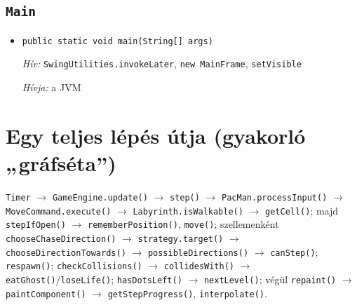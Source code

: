 \documentclass[10pt, a4paper]{article}
\newcommand{\fn}[3]{%
  \item \texttt{#1}\par
  {\small\textit{Hív:} #2\par\textit{Hívja:} #3}\vspace{3pt}}
\begin{document}
\subsection*{\texttt{Main}}
\begin{itemize}
\fn{public static void main(String[] args)}{\texttt{SwingUtilities.invokeLater}, \texttt{new MainFrame}, \texttt{setVisible}}{a JVM}
\end{itemize}

\section*{Egy teljes lépés útja (gyakorló „gráfséta”)}
\texttt{Timer} $\to$ \texttt{GameEngine.update()} $\to$ \texttt{step()} $\to$ \texttt{PacMan.processInput()} $\to$ \texttt{MoveCommand.execute()} $\to$ \texttt{Labyrinth.isWalkable()} $\to$ \texttt{getCell()}; majd \texttt{stepIfOpen()} $\to$ \texttt{rememberPosition()}, \texttt{move()}; szellemenként \texttt{chooseChaseDirection()} $\to$ \texttt{strategy.target()} $\to$ \texttt{chooseDirectionTowards()} $\to$ \texttt{possibleDirections()} $\to$ \texttt{canStep()}; \texttt{respawn()}; \texttt{checkCollisions()} $\to$ \texttt{collidesWith()} $\to$ \texttt{eatGhost()}/\texttt{loseLife()}; \texttt{hasDotsLeft()} $\to$ \texttt{nextLevel()}; végül \texttt{repaint()} $\to$ \texttt{paintComponent()} $\to$ \texttt{getStepProgress()}, \texttt{interpolate()}.
\end{document}
